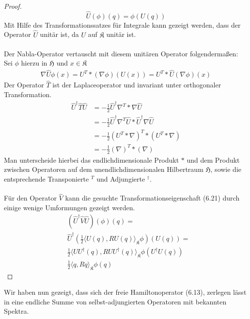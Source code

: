 \documentclass[11pt,a4paper,leqno]{report}
\numberwithin{equation}{chapter}
\begin{document}
\begin{proof}
	\begin{equation*}
		\hat{U}(\phi)(q)=\phi(U(q))
	\end{equation*}
	Mit Hilfe des Transformationssatzes f\"ur Integrale kann gezeigt werden, dass der Operator $\hat{U}$ unit\"ar ist, da $U$ auf $\mathfrak{K}$ unit\"ar ist.\\
	\\
	Der Nabla-Operator vertauscht mit diesem unit\"aren Operator folgendermaßen:\\
	Sei $\phi$ hierzu in $\mathfrak{H}$ und $x\in \mathfrak{K}$
	\begin{align}
		\nabla \hat{U}\phi(x)=U^T * (\nabla \phi) (U(x)) = U^T * \hat{U}(\nabla \phi) (x)
	\end{align}
	Der Operator $\hat{T}$ ist der Laplaceoperator und invariant unter orthogonaler Transformation.
	\begin{align*}
		\hat{U}^\dagger\hat{T}\hat{U} &= -\frac{1}{2}\hat{U}^\dagger\nabla^T * \nabla \hat{U}\\
		&=-\frac{1}{2}\hat{U}^\dagger\nabla^T\hat{U} * \hat{U}^\dagger\nabla \hat{U}\\
		&=-\frac{1}{2}(U^T*\nabla)^T*(U^T*\nabla)\\
		&=-\frac{1}{2}(\nabla)^T*(\nabla)
	\end{align*}
	Man unterscheide hierbei das endlichdimensionale Produkt $*$ und dem Produkt zwischen Operatoren auf dem unendlichdimensionalen Hilbertraum $\mathfrak{H}$, sowie die entsprechende Transponierte $^T$ und Adjungierte $^\dagger$.\\  
	\\ 
	F\"ur den Operator $\hat{V}$ kann die gesuchte Transformationseigenschaft (6.21) durch einige wenige Umformungen gezeigt werden.
	\begin{align*}
		&(\hat{U}^\dagger\hat{V}\hat{U})(\phi)(q)= \\
		&\hat{U}^\dagger(\frac{1}{2}\langle U(q), R U(q)\rangle_{\mathfrak{K}}\phi)(U(q))=\\
		&\frac{1}{2}\langle  UU^\dagger(q), R  UU^\dagger(q)\rangle_{\mathfrak{K}}\phi(U^\dagger U(q))\\
		&\frac{1}{2}\langle q, R q\rangle_{\mathfrak{K}}\phi(q)
	\end{align*}

\end{proof}
\noindent
Wir haben nun gezeigt, dass sich der freie Hamiltonoperator (6.13), zerlegen l\"asst in eine endliche Summe von selbst-adjungierten Operatoren mit bekannten Spektra.\\
\end{document}
